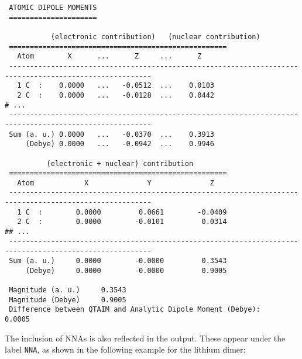 \begin{lstlisting}
 ATOMIC DIPOLE MOMENTS
 =====================

           (electronic contribution)   (nuclear contribution)
 ====================================================
   Atom        X      ...      Z     ...      Z
 --------------------------------------------------------------------------------------------------------
   1 C  :    0.0000   ...   -0.0512  ...    0.0103
   2 C  :    0.0000   ...   -0.0128  ...    0.0442
# ...
 --------------------------------------------------------------------------------------------------------
 Sum (a. u.) 0.0000   ...   -0.0370  ...    0.3913
     (Debye) 0.0000   ...   -0.0942  ...    0.9946

          (electronic + nuclear) contribution
 ====================================================
   Atom            X              Y              Z
 --------------------------------------------------------------------------------------------------------
   1 C  :        0.0000         0.0661        -0.0409
   2 C  :        0.0000        -0.0101         0.0314
## ...
 --------------------------------------------------------------------------------------------------------
 Sum (a. u.)     0.0000        -0.0000         0.3543
     (Debye)     0.0000        -0.0000         0.9005

 Magnitude (a. u.)     0.3543
 Magnitude (Debye)     0.9005
 Difference between QTAIM and Analytic Dipole Moment (Debye):       0.0005
\end{lstlisting}

\newpage
The inclusion of \glspl{NNA} is also reflected in the output. These appear
under the label \texttt{NNA}, as shown in the following example for the
lithium dimer:

